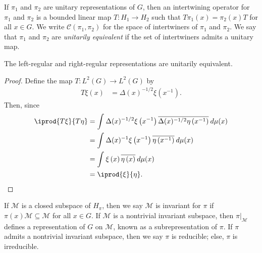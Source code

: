 \documentclass[12pt]{mypackage}
\begin{document}
If $\pi_1$ and $\pi_2$ are unitary representations of $G$, then an intertwining operator for $\pi_1$ and $\pi_2$ is a bounded linear map $T\colon H_{1}\rightarrow H_2$ such that $T\pi_1(x) = \pi_2(x)T$ for all $x\in G$. We write $ \mathcal{C}\left( \pi_1,\pi_2 \right) $ for the space of intertwiners of $\pi_1$ and $\pi_2$. We say that $\pi_1$ and $\pi_2$ are \textit{unitarily equivalent} if the set of intertwiners admits a unitary map.
\begin{proposition}
  The left-regular and right-regular representations are unitarily equivalent.
\end{proposition}
\begin{proof}
  Define the map $T\colon L^2(G)\rightarrow L^2(G)$ by
  \begin{align*}
    T\xi (x) &= \Delta(x)^{-1/2}\xi\left( x^{-1} \right).
  \end{align*}
  Then, since
  \begin{align*}
    \iprod{T\xi}{T\eta} &= \int_{}^{} \Delta(x)^{-1/2}\xi\left( x^{-1} \right) \overline{\Delta(x)^{-1/2}\eta\left( x^{-1} \right)}\:d\mu(x)\\
                        &= \int_{}^{} \Delta(x)^{-1} \xi\left( x^{-1} \right) \overline{\eta\left( x^{-1} \right)}\:d\mu(x)\\
                        &= \int_{}^{} \xi\left( x \right) \overline{\eta\left( x \right)}\:d\mu(x)\\
                        &= \iprod{\xi}{\eta}.
  \end{align*}
\end{proof}
If $ \mathcal{M} $ is a closed subspace of $H_{\pi}$, then we say $\mathcal{M}$ is invariant for $\pi$ if $\pi(x)\mathcal{M}\subseteq \mathcal{M}$ for all $x\in G$. If $ \mathcal{M} $ is a nontrivial invariant subspace, then $\pi|_{\mathcal{M}}$ defines a representation of $G$ on $ \mathcal{M} $, known as a subrepresentation of $\pi$. If $\pi$ admits a nontrivial invariant subspace, then we say $\pi$ is reducible; else, $\pi$ is irreducible.
\end{document}
